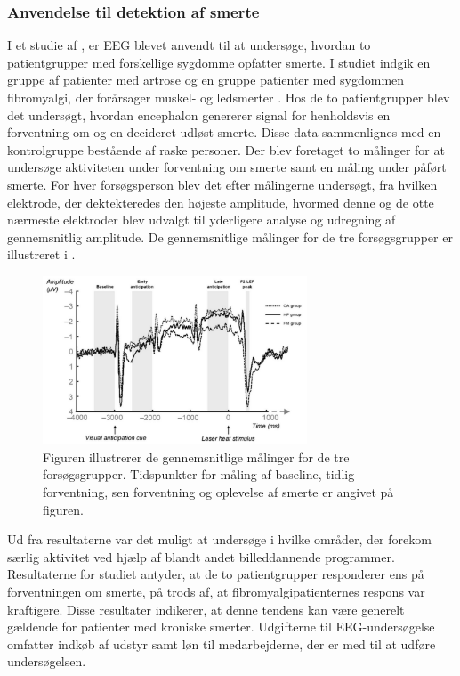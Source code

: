 \subsubsection{Anvendelse til detektion af smerte}
I et studie af \citep{Brown2013}, er EEG blevet anvendt til at undersøge, hvordan to patientgrupper med forskellige sygdomme opfatter smerte. I studiet indgik en gruppe af patienter med artrose og en gruppe patienter med sygdommen fibromyalgi, der forårsager muskel- og ledsmerter \citep{Brown2013}\citep{9}. Hos de to patientgrupper blev det undersøgt, hvordan encephalon genererer signal for henholdsvis en forventning om og en decideret udløst smerte. Disse data sammenlignes med en kontrolgruppe bestående af raske personer. Der blev foretaget to målinger for at undersøge aktiviteten under forventning om smerte samt en måling under påført smerte. For hver forsøgsperson blev det efter målingerne undersøgt, fra hvilken elektrode, der dektekteredes den højeste amplitude, hvormed denne og de otte nærmeste elektroder blev udvalgt til yderligere analyse og udregning af gennemsnitlig amplitude. De gennemsnitlige målinger for de tre forsøgsgrupper er illustreret i .
\begin{figure}[H] 
	\begin{center}
		\includegraphics[width=0.7\textwidth]{figures/bProblemanalyse/EEG_ERP}
	\end{center}
	\caption{Figuren illustrerer de gennemsnitlige målinger for de tre forsøgsgrupper. Tidspunkter for måling af baseline, tidlig forventning, sen forventning og oplevelse af smerte er angivet på figuren. \citep{Brown2013}} 
	\label{fig:EEG_gns} 
\end{figure} 

Ud fra resultaterne var det muligt at undersøge i hvilke områder, der forekom særlig aktivitet ved hjælp af blandt andet billeddannende programmer. Resultaterne for studiet antyder, at de to patientgrupper responderer ens på forventningen om smerte, på trods af, at fibromyalgipatienternes respons var kraftigere. Disse resultater indikerer, at denne tendens kan være generelt gældende for patienter med kroniske smerter. \citep{Brown2013} Udgifterne til EEG-undersøgelse omfatter indkøb af udstyr samt løn til medarbejderne, der er med til at udføre undersøgelsen\citep{Green1985}.

